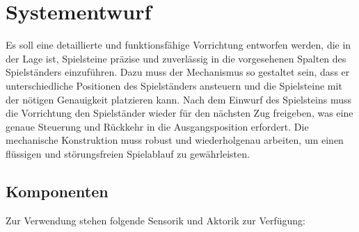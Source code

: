 \chapter{Systementwurf}

Es soll eine detaillierte und funktionsfähige Vorrichtung entworfen werden, die in der Lage ist, Spielsteine präzise und zuverlässig in die vorgesehenen Spalten des Spielständers einzuführen. Dazu muss der Mechanismus so gestaltet sein, dass er unterschiedliche Positionen des Spielständers ansteuern und die Spielsteine mit der nötigen Genauigkeit platzieren kann. Nach dem Einwurf des Spielsteins muss die Vorrichtung den Spielständer wieder für den nächsten Zug freigeben, was eine genaue Steuerung und Rückkehr in die Ausgangsposition erfordert. Die mechanische Konstruktion muss robust und wiederholgenau arbeiten, um einen flüssigen und störungsfreien Spielablauf zu gewährleisten.


\section{Komponenten}
Zur Verwendung stehen folgende Sensorik und Aktorik zur Verfügung:


